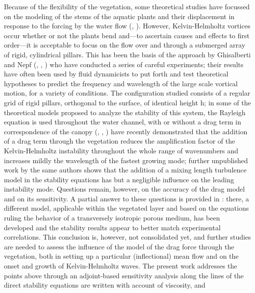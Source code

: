 Because of the flexibility of the vegetation, some theoretical studies have focussed on the
modeling of the stems of the aquatic plants and their displacement in response to the forcing by the
water flow (\citet{py2004mixing}, \citet{patil2010characteristics}). However, Kelvin-Helmholtz vortices occur whether or not the plants bend and—to ascertain causes and effects to first order—it is acceptable to focus on the flow over and through a
submerged array of rigid, cylindrical pillars. This has been the basis of the approach by Ghisalberti
and Nepf (\citet{ghisalberti2002mixing}, \citet{ghisalberti2004limited}, \citet{ghisalberti2005mass}) who have conducted a series of careful experiments; their results have often been
used by fluid dynamicists to put forth and test theoretical hypotheses to predict the frequency and
wavelength of the large scale vortical motion, for a variety of conditions. The configuration studied
consists of a regular grid of rigid pillars, orthogonal to the surface, of identical height h; in some
of the theoretical models proposed to analyze the stability of this system, the Rayleigh equation is
used throughout the water channel, with or without a drag term in correspondence of the canopy (\citet{raupach1996coherent}, \citet{py2004mixing}, \citet{singh2016linear})
\citet{zampogna2016instability} have recently demonstrated that the addition of a drag term through the vegetation reduces the amplification factor of the Kelvin-Helmholtz instability throughout the whole
range of wavenumbers and increases mildly the wavelength of the fastest growing mode; further
unpublished work by the same authors shows that the addition of a mixing length turbulence model
in the stability equations has but a negligible influence on the leading instability mode. Questions
remain, however, on the accuracy of the drag model and on its sensitivity. A partial answer to these
questions is provided in \citet{zampogna2016instability}: there, a different model, applicable within the vegetated layer and
based on the equations ruling the behavior of a transversely isotropic porous medium, has been
developed and the stability results appear to better match experimental correlations. This conclusion
is, however, not consolidated yet, and further studies are needed to assess the influence of the model
of the drag force through the vegetation, both in setting up a particular (inflectional) mean flow and
on the onset and growth of Kelvin-Helmholtz waves.
The present work addresses the points above through an adjoint-based sensitivity analysis along
the lines of \citet{bottaro2003effect} the direct stability equations are written with account of viscosity, and
